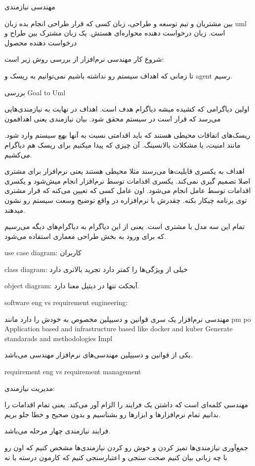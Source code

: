 مهندسی نیازمندی

بین مشتریان و تیم توسعه و طراحی، زبان کسی که قرار طراحی انجام بده زبان uml است.
زبان درخواست دهنده محواره‌ای هستش. یک زبان مشترک بین طراح و درخواست دهنده محصول

شروع کار مهندسی نرم‌افزار از بررسی روش زیر است:

تا زمانی که اهداف سیستم رو نداشته باشیم نمی‌توانیم به ریسک و agent رسیم.

بررسی Goal to Uml

اولین دیاگرامی که کشیده میشه دیاگرام هدف است.
اهداف در نهایت به نیازمندی‌هایی می‌رسد که قرار است در سیستم محقق شود.
بیان نیازمندی یعنی اهدافمون

ریسک‌های اتفاقات محیطی هستند که باید اقدامتی نسبت به آنها بهع سیستم وارد شود.
مانند امنیت، یا مشکلات بالانسینگ. آن چیزی که پیدا میکنیم برای ریسک هم دیاگرام
می‌کشیم.

اهداف به یکسری قابلیت‌ها می‌رسند مثلا محیطی هستند یعنی نرم‌افزار برای مشتری اصلا
تصمیم گیری نمی‌کند. یکسری اقدامات توسط نرم‌افزار انجام میش‌شود و یکسری اقدامات
توسط عامل انجام می‌شود. اون عامل کسی که تعیین می‌کنه که قرار مشتری توی برنامه
چیکار بکنه. چقدرش با نرم‌افزاره در واقع توضیح وسعت سیستم رو نشون میدهند.

تمام این سه مدل با مشتری است.  یعنی از این دیاگرام به دیاگرام‌های دیگه می‌رسیم
که برای ورود به بخش طراحی معماری استفاده می‌شود.

use case diagram: کاربران

class  diagram: خیلی از ویژگی‌ها را کمتر دارد تجرید بالاتری دارد

object diagram: آبجکت تنها در دیتیل معنا دارد.

software eng vs requirement engineering:

مهندسی نرم‌افزار یک سری قوانین و دسیپلین مخصوص به خودش را دارد مانند 
pm
po
Application based and infrastructure based like docker and kuber
Generate standarads and methodologies
Impl

یکی از قوانین و دسیپلین مهندسی‌های نرم‌افزار مهندسی می‌باشد.

requirement eng vs requirement management

مدیریت نیازمندی: 

مهندسی کلمه‌ای است که داشتن یک فرایند را الزام آور می‌کند. یعنی تمام اقدامات را
بدانیم تمام نرم‌افزار‌ها و ابزار‌ها رو بشناسیم و بدون صحیح و خطا جلو بریم.

فرایند نیازمندی چهار مرحله می‌باشد.

جمع‌آوری نیازمندی‌ها
تمیز کردن و خوش رو کردن نیازمندی‌ها
مشخص کنیم که اون رو با چه زبانی بیان کنیم
صحت سنجی و اعتبارسنجی کنیم که کارمون درسته یا نه

